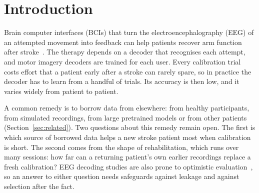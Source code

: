 \documentclass[pdflatex,sn-mathphys-num]{sn-jnl}
\begin{document}

\maketitle

\section{Introduction}\label{sec:intro}

Brain computer interfaces (BCIs) that turn the electroencephalography (EEG) of an attempted movement into feedback can help patients recover arm function after stroke~\cite{mortezaei2026}. The therapy depends on a decoder that recognises each attempt, and motor imagery decoders are trained for each user. Every calibration trial costs effort that a patient early after a stroke can rarely spare, so in practice the decoder has to learn from a handful of trials. Its accuracy is then low, and it varies widely from patient to patient.

A common remedy is to borrow data from elsewhere: from healthy participants, from simulated recordings, from large pretrained models or from other patients (Section~\ref{sec:related}). Two questions about this remedy remain open. The first is which source of borrowed data helps a new stroke patient most when calibration is short. The second comes from the shape of rehabilitation, which runs over many sessions: how far can a returning patient's own earlier recordings replace a fresh calibration? EEG decoding studies are also prone to optimistic evaluation~\cite{brookshire2024}, so an answer to either question needs safeguards against leakage and against selection after the fact.
\end{document}
